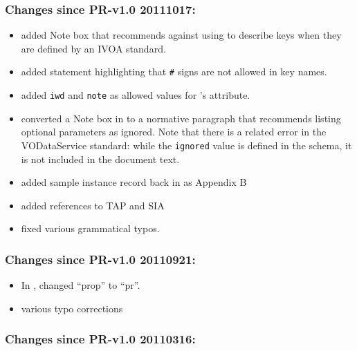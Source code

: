 \documentclass[11pt,a4paper]{ivoa}
\begin{document}
\subsubsection{Changes since PR-v1.0 20111017:}

\begin{itemize}
\item  added Note box that recommends against using 
        to
       describe keys when they are defined by an IVOA standard.

\item  added statement highlighting that \verb|#| signs are
       not allowed in key names.

\item  added \texttt{iwd} and \texttt{note} as allowed values
       for 's
        attribute.

\item  converted a Note box in to a normative paragraph
       that recommends listing optional 
       parameters as ignored.  Note that there is a related error in
       the VODataService standard: while
       the \texttt{ignored} value is defined in
       the schema, it is not included in the document text.

\item  added sample 
       instance record back in as Appendix B

\item  added references to TAP and SIA

\item  fixed various grammatical typos.

\end{itemize}

\subsubsection{Changes since PR-v1.0 20110921:}

\begin{itemize}

\item  In , changed ``prop'' to ``pr''.

\item  various typo corrections

\end{itemize}

\subsubsection{Changes since PR-v1.0 20110316:}
\end{document}
